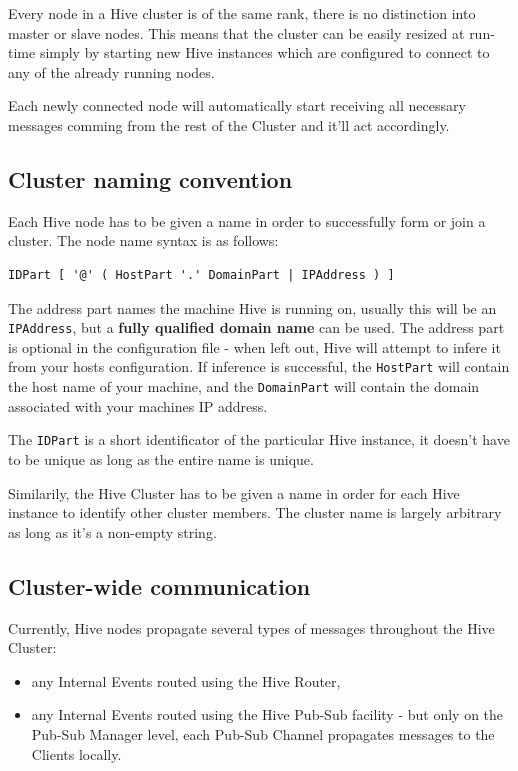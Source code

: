 \documentclass[a4paper]{article}
\begin{document}
Every node in a Hive cluster is of the same rank, there is no distinction into master or slave nodes. This means that the cluster can be easily resized at run-time simply by starting new Hive instances which are configured to connect to any of the already running nodes.

Each newly connected node will automatically start receiving all necessary messages comming from the rest of the Cluster and it'll act accordingly.
\subsection{Cluster naming convention}
\label{sec-8-2}
\label{ref-cluster-naming-convention}


Each Hive node has to be given a name in order to successfully form or join a cluster. The node name syntax is as follows:


\begin{verbatim}
IDPart [ '@' ( HostPart '.' DomainPart | IPAddress ) ]
\end{verbatim}




The address part names the machine Hive is running on, usually this will be an \texttt{IPAddress}, but a \textbf{fully qualified domain name} can be used.
The address part is optional in the configuration file - when left out, Hive will attempt to infere it from your hosts configuration. If inference is successful, the \texttt{HostPart} will contain the host name of your machine, and the \texttt{DomainPart} will contain the domain associated with your machines IP address.

The \texttt{IDPart} is a short identificator of the particular Hive instance, it doesn't have to be unique as long as the entire name is unique.

Similarily, the Hive Cluster has to be given a name in order for each Hive instance to identify other cluster members. The cluster name is largely arbitrary as long as it's a non-empty string.
\subsection{Cluster-wide communication}
\label{sec-8-3}

Currently, Hive nodes propagate several types of messages throughout the Hive Cluster:


\begin{itemize}
\item any Internal Events routed using the Hive Router,
\item any Internal Events routed using the Hive Pub-Sub facility - but only on the Pub-Sub Manager level, each Pub-Sub Channel propagates messages to the Clients locally.
\end{itemize}
\end{document}
